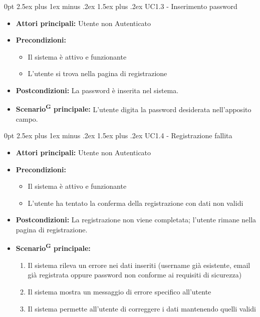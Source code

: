 \documentclass[a4paper, 11pt]{article}
\makeatletter
\renewcommand\paragraph{\@startsection{paragraph}{4}
  {0pt}
  {2.5ex plus 1ex minus .2ex}
  {1.5ex plus .2ex}
  {\normalfont\normalsize\bfseries\color{AccentDark}}}
\makeatother
\begin{document}
\paragraph{UC1.3 - Inserimento password}\label{UC1.3}
\begin{itemize}
	\item \textbf{Attori principali:} Utente non Autenticato
	\item \textbf{Precondizioni:}
	\begin{itemize}
		\item Il sistema è attivo e funzionante
		\item L'utente si trova nella pagina di registrazione
	\end{itemize}
	\item \textbf{Postcondizioni:} La password è inserita nel sistema.
	\item \textbf{Scenario\textsuperscript{G} principale:} L'utente digita la password desiderata nell'apposito campo.
\end{itemize}

\paragraph{UC1.4 - Registrazione fallita}\label{UC1.4}
\begin{itemize}
	\item \textbf{Attori principali:} Utente non Autenticato
	\item \textbf{Precondizioni:}
	\begin{itemize}
		\item Il sistema è attivo e funzionante
		\item L'utente ha tentato la conferma della registrazione con dati non validi
	\end{itemize}
	\item \textbf{Postcondizioni:} La registrazione non viene completata; l'utente rimane nella pagina di registrazione.
	\item \textbf{Scenario\textsuperscript{G} principale:}
	\begin{enumerate}
		\item Il sistema rileva un errore nei dati inseriti (username già esistente, email già registrata oppure password non conforme ai requisiti di sicurezza)
		\item Il sistema mostra un messaggio di errore specifico all'utente
		\item Il sistema permette all'utente di correggere i dati mantenendo quelli validi
	\end{enumerate}
\end{itemize}
\end{document}
